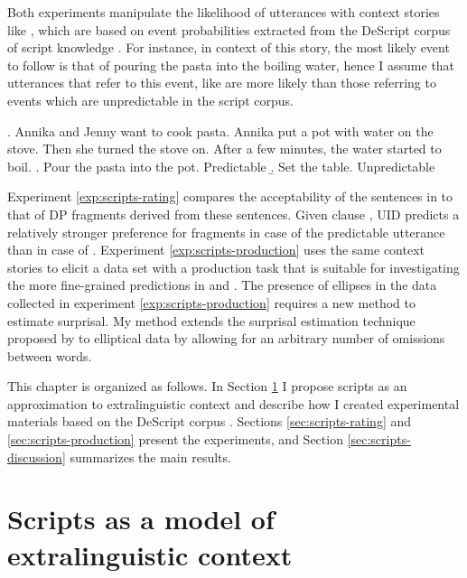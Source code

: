 Both experiments manipulate the likelihood of utterances with context stories like \Next, which are based on event probabilities extracted from the DeScript corpus of script knowledge \citep{wanzare.etal2016}. For instance, in context of this story, the most likely event to follow is that of pouring the pasta into the boiling water, hence I assume that utterances that refer to this event, like \Next[a] are more likely than those referring to events which are unpredictable in the script corpus.

\ex. Annika and Jenny want to cook pasta. Annika put a pot with water on the stove. Then she turned the stove on. After a few minutes, the water started to boil.
\a. Pour the pasta into the pot. \hfill Predictable
\b. Set the table. \hfill Unpredictable

Experiment \ref{exp:scripts-rating} compares the acceptability of the sentences in \Last[a,b] to that of DP fragments derived from these sentences. Given clause \LLast[c], UID predicts a relatively stronger preference for fragments in case of the predictable utterance \Last[a]  than in case of \Last[b]. Experiment \ref{exp:scripts-production} uses the same context stories to elicit a data set with a production task that is suitable for investigating the more fine-grained predictions in \LLast[a] and \LLast[b]. The presence of ellipses in the data collected in experiment \ref{exp:scripts-production} requires a new method to estimate surprisal. My method extends the surprisal estimation technique proposed by \citet{hale2001} to elliptical data by allowing for an arbitrary number of omissions between words.

This chapter is organized as follows. In Section \ref{sec:infotheory-scripts} I propose scripts as an approximation to extralinguistic context and describe how I created experimental materials based on the DeScript corpus \citep{wanzare.etal2016}. Sections \ref{sec:scripts-rating} and \ref{sec:scripts-production} present the experiments, and Section \ref{sec:scripts-discussion} summarizes the main results.

\section{Scripts as a model of extralinguistic context}
\label{sec:infotheory-scripts}

